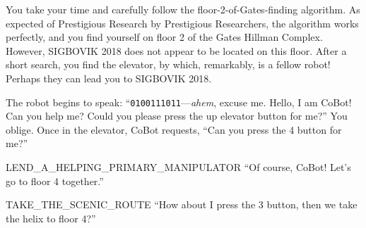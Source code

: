 You take your time and carefully follow the floor-2-of-Gates-finding algorithm.
As expected of Prestigious Research by Prestigious Researchers,
the algorithm works perfectly, and you find yourself on floor 2
of the Gates Hillman Complex.
However, SIGBOVIK 2018 does not appear to be located on this floor.
After a short search, you find the elevator,
by which, remarkably, is a fellow robot!
Perhaps they can lead you to SIGBOVIK 2018.

The robot begins to speak:
``\texttt{0100111011}---\emph{ahem}, excuse me.
Hello, I am CoBot!
Can you help me?
Could you please press the up elevator button for me?''
You oblige.
Once in the elevator, CoBot requests,
``Can you press the 4 button for me?''

\begin{switch}
\item{LEND\_A\_HELPING\_PRIMARY\_MANIPULATOR}
  ``Of course, CoBot! Let's go to floor 4 together.''
\item{TAKE\_THE\_SCENIC\_ROUTE}
  ``How about I press the 3 button, then we take the helix to floor 4?''
\end{switch}


